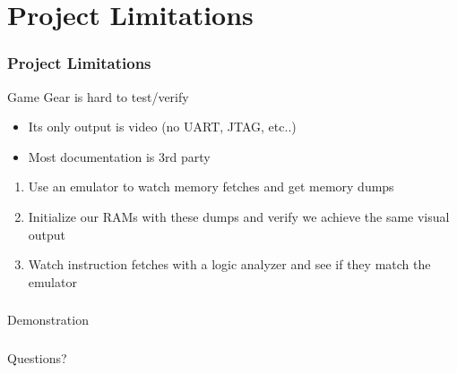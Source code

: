 \documentclass{beamer}
\newlength{\wideitemsep}
\let\olditem\item
\renewcommand{\item}{\setlength{\itemsep}{\wideitemsep}\olditem}
\begin{document}
\section{Project Limitations}
\begin{frame}
    \frametitle{Project Limitations}
    Game Gear is hard to test/verify
    \begin{itemize}
            \olditem<2-> Its only output is video (no UART, JTAG, etc..)
            \olditem<3-> Most documentation is 3rd party
    \end{itemize}
    \vspace{0.25cm}
    \begin{enumerate}
        \olditem<5-> Use an emulator to watch memory fetches and get memory dumps
        \olditem<6-> Initialize our RAMs with these dumps and verify we achieve the same visual output
        \olditem<7-> Watch instruction fetches with a logic analyzer and see if they match the emulator
    \end{enumerate}
    \vspace{0.25cm}
\end{frame}

\begin{frame}
\frametitle{}
    \begin{center}
        \Huge
        Demonstration
    \end{center}
\end{frame}

\begin{frame}
\frametitle{}
    \begin{center}
        \Huge
        Questions?
    \end{center}
\end{frame}

\newpage
\end{document}
